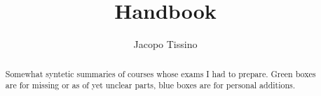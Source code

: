 \documentclass[a4paper, 12pt]{report}
\title{Handbook}
\author{Jacopo Tissino}
\begin{document}
\maketitle

\begin{abstract}
    Somewhat syntetic summaries of courses whose exams I had to prepare.
    Green boxes are for missing or as of yet unclear parts, blue boxes are for  personal additions.
\end{abstract}


\setcounter{tocdepth}{4}
\tableofcontents






\end{document}
